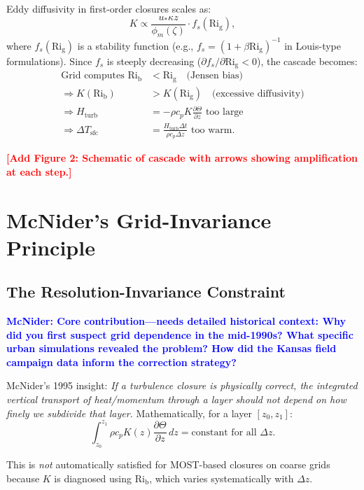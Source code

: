 \documentclass[twocolumn,11pt]{article}
\newcommand{\Rig}{\text{Ri}_{\text{g}}}
\newcommand{\Rib}{\text{Ri}_{\text{b}}}
\newcommand{\TODO}[1]{\textcolor{red}{\textbf{[#1]}}}
\newcommand{\MCNIDER}[1]{\textcolor{blue}{\textbf{McNider: #1}}}
\begin{document}
Eddy diffusivity in first-order closures scales as:
\begin{equation}
K \propto \frac{u_* \kappa z}{\phi_m(\zeta)} \cdot f_s(\Rig),
\end{equation}
where $f_s(\Rig)$ is a stability function (e.g., $f_s = (1 + \beta \Rig)^{-1}$ in Louis-type formulations). Since $f_s$ is steeply decreasing ($\partial f_s / \partial \Rig < 0$), the cascade becomes:
\begin{align}
\text{Grid computes } \Rib &< \Rig \quad \text{(Jensen bias)} \\
\Rightarrow K(\Rib) &> K(\Rig) \quad \text{(excessive diffusivity)} \\
\Rightarrow H_{\text{turb}} &= -\rho c_p K \frac{\partial \Theta}{\partial z} \text{ too large} \\
\Rightarrow \Delta T_{\text{sfc}} &= \frac{H_{\text{turb}} \Delta t}{\rho c_p \Delta z} \text{ too warm}.
\end{align}

\TODO{Add Figure 2: Schematic of cascade with arrows showing amplification at each step.}

\section{McNider's Grid-Invariance Principle}
\label{sec:mcnider}

\subsection{The Resolution-Invariance Constraint}

\MCNIDER{Core contribution—needs detailed historical context: Why did you first suspect grid dependence in the mid-1990s? What specific urban simulations revealed the problem? How did the Kansas field campaign data inform the correction strategy?}

McNider's 1995 insight: \textit{If a turbulence closure is physically correct, the integrated vertical transport of heat/momentum through a layer should not depend on how finely we subdivide that layer.} Mathematically, for a layer $[z_0, z_1]$:
\begin{equation}
\int_{z_0}^{z_1} \rho c_p K(z) \frac{\partial \Theta}{\partial z}\,dz = \text{constant for all } \Delta z.
\label{eq:invariance_principle}
\end{equation}

\noindent This is \textit{not} automatically satisfied for MOST-based closures on coarse grids because $K$ is diagnosed using $\Rib$, which varies systematically with $\Delta z$.
\end{document}
